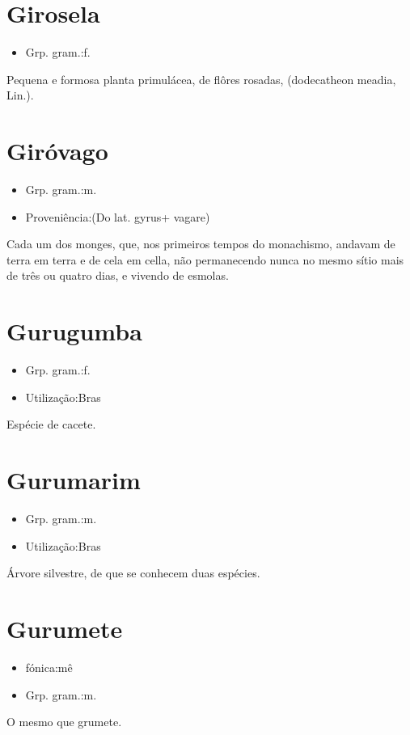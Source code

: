 \section{Girosela}
\begin{itemize}
\item {Grp. gram.:f.}
\end{itemize}
Pequena e formosa planta primulácea, de flôres rosadas, (\textunderscore dodecatheon meadia\textunderscore , Lin.).
\section{Giróvago}
\begin{itemize}
\item {Grp. gram.:m.}
\end{itemize}
\begin{itemize}
\item {Proveniência:(Do lat. \textunderscore gyrus\textunderscore  + \textunderscore vagare\textunderscore )}
\end{itemize}
Cada um dos monges, que, nos primeiros tempos do monachismo, andavam de terra em terra e de cela em cella, não permanecendo nunca no mesmo sítio mais de três ou quatro dias, e vivendo de esmolas.
\section{Gurugumba}
\begin{itemize}
\item {Grp. gram.:f.}
\end{itemize}
\begin{itemize}
\item {Utilização:Bras}
\end{itemize}
Espécie de cacete.
\section{Gurumarim}
\begin{itemize}
\item {Grp. gram.:m.}
\end{itemize}
\begin{itemize}
\item {Utilização:Bras}
\end{itemize}
Árvore silvestre, de que se conhecem duas espécies.
\section{Gurumete}
\begin{itemize}
\item {fónica:mê}
\end{itemize}
\begin{itemize}
\item {Grp. gram.:m.}
\end{itemize}
O mesmo que \textunderscore grumete\textunderscore .
